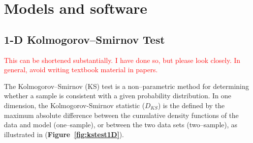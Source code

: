 \documentclass[codesnippet]{jss}
\newcommand{\RBnote}[1]{\textcolor{red}{#1}}
\begin{document}


\section{Models and software} \label{sec:models}

\subsection{1-D Kolmogorov--Smirnov Test}

\RBnote{This can be shortened substantially.  I have done so, but please look closely.  In general, avoid writing textbook material in papers.}

The Kolmogorov--Smirnov (KS) test is a non--parametric method for determining whether a sample is consistent with a given probability distribution. %
%
%
%
%
In one dimension, 
the Kolmogorov-Smirnov statistic ($D_{KS}$) is the defined by the maximum absolute difference between the cumulative density functions of the data and model (one--sample), or between the two data sets (two--sample),
as illustrated in (\textbf{Figure~\ref{fig:kstest1D}}).
\end{document}
